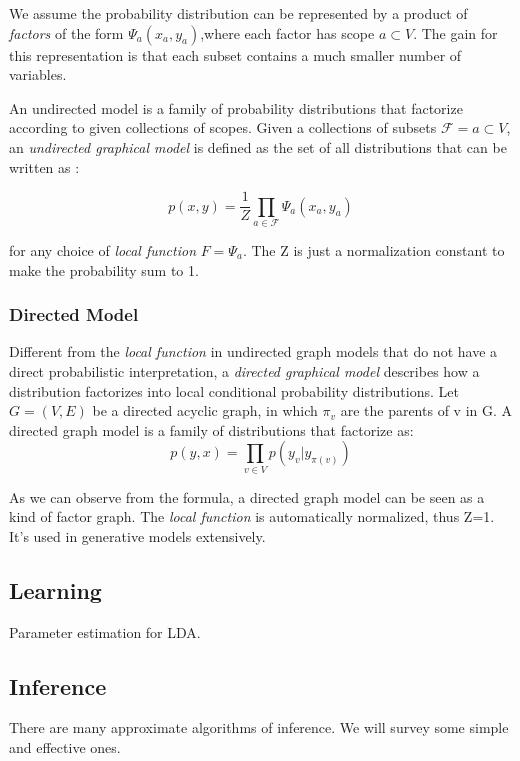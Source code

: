 We assume the probability distribution can be represented by a product of \emph{factors} of the form $\Psi_{a}(x_{a},y_{a})$,where each factor has scope $a \subset V$. The gain for this representation is that each subset contains a much smaller number of variables. 

An undirected model is a family of probability distributions that factorize according to given collections of scopes. Given a collections of subsets $\mathcal{F}=a \subset V$, an \emph{undirected graphical model} is defined as the set of all distributions that can be written as :

\begin{equation}
p(x,y) = \frac{1}{Z} \prod_{a \in \mathcal{F}} \Psi_{a}(x_{a},y_{a})
\end{equation}

for any choice of \emph{local function} $F = {\Psi_{a}}$. The Z is just a normalization constant to make the probability sum to 1. 

\subsubsection{Directed Model}
Different from the \emph{local function} in undirected graph models that do not have a direct probabilistic interpretation, a \emph{directed graphical model} describes how a distribution factorizes into local conditional probability distributions. Let $G=(V,E)$ be a directed acyclic graph, in which $\pi_{v}$ are the parents of v in G. A directed graph model is a family of distributions that factorize as:
\begin{equation}
p(y,x)=\prod_{v \in V} p(y_{v}|y_{\pi(v)})
\end{equation}

As we can observe from the formula, a directed graph model can be seen as a kind of factor graph. The \emph{local function} is automatically normalized, thus Z=1. It's used in generative models extensively. 

\subsection{Learning}
Parameter estimation for LDA. \cite{heinrich2005parameter}

\subsection{Inference}
There are many approximate algorithms of inference. We will survey some simple and effective ones.

